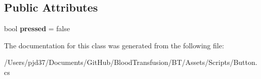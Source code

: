 \subsection*{Public Attributes}
\begin{DoxyCompactItemize}
\item 
bool {\bfseries pressed} = false\hypertarget{class_button_a7ac9f95924e2004cf80666ae1952f39e}{}\label{class_button_a7ac9f95924e2004cf80666ae1952f39e}

\end{DoxyCompactItemize}


The documentation for this class was generated from the following file\+:\begin{DoxyCompactItemize}
\item 
/\+Users/pjd37/\+Documents/\+Git\+Hub/\+Blood\+Transfusion/\+B\+T/\+Assets/\+Scripts/Button.\+cs\end{DoxyCompactItemize}
